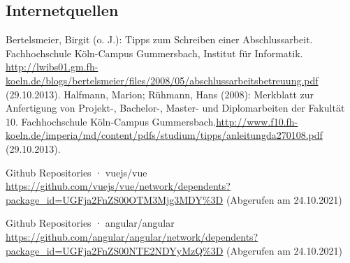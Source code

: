 \subsection{Internetquellen}
\begin{thebibliography}{HR08} %
  Bertelsmeier, Birgit (o. J.): Tipps zum Schrei\-b\-en ei\-n\-er Ab\-sch\-luss\-ar\-beit. Fach\-hoch\-schu\-le Köln-Campus Gummersbach, Institut für Informatik. \url{http://lwibs01.gm.fh-koeln.de/blogs/bertelsmeier/files/2008/05/abschlussarbeitsbetreuung.pdf} (29.10.2013).
   Halfmann, Marion; Rühmann, Hans (2008): Merkblatt zur Anfertigung von Projekt-, Bachelor-, Master- und Diplomarbeiten der Fakultät 10. Fachhochschule Köln-Campus Gummersbach.\url{http://www.f10.fh-koeln.de/imperia/md/content/pdfs/studium/tipps/anleitungda270108.pdf} (29.10.2013).




   Github Repositories · vuejs/vue \url{ https://github.com/vuejs/vue/network/dependents?package_id=UGFja2FnZS00OTM3Mjg3MDY\%3D}
  (Abgerufen am 24.10.2021)

   Github Repositories · angular/angular \url{https://github.com/angular/angular/network/dependents?package_id=UGFja2FnZS00NTE2NDYyMzQ%3D}
  (Abgerufen am 24.10.2021)


\end{thebibliography}
